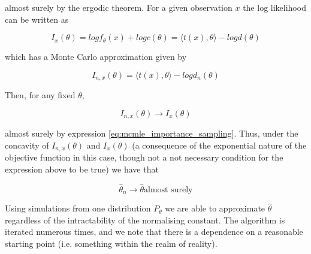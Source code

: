 almost surely by the ergodic theorem. For a given observation $x$ the log likelihood can be written as

\begin{equation}
I_x(\theta) = log{f_\theta(x)} + log{c(\theta)} = \langle t(x), \theta \rangle - log{d(\theta)}
\end{equation}

which has a Monte Carlo approximation given by 

\begin{equation}
I_{n,x}(\theta) = \langle t(x), \theta \rangle - log{d_n(\theta)}
\end{equation}

Then, for any fixed $\theta$,

\begin{equation}
I_{n,x}(\theta) \rightarrow I_x(\theta)
\end{equation}

almost surely by expression \ref{eq:mcmle_importance_sampling}. Thus, under the concavity of $I_{n,x}(\theta)$ and $I_x(\theta)$ (a consequence of the exponential nature of the objective function in this case, though not a not necessary condition for the expression above to be true) we have that 

\begin{equation}
\hat{\theta}_n \rightarrow \hat{\theta} \text{almost surely}
\end{equation}

Using simulations from one distribution $P_\theta$ we are able to approximate $\hat{\theta}$ regardless of the intractability of the normalising constant. The algorithm is iterated numerous times, and we note that there is a dependence on a reasonable starting point (i.e. something within the realm of reality). 



